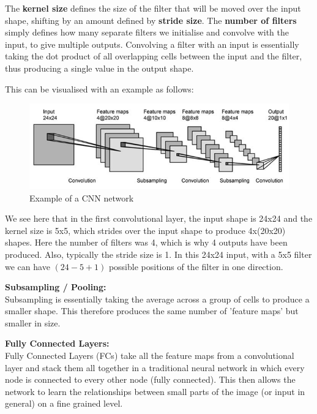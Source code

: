 \documentclass[12pt,a4paper,twoside]{report}
\begin{document}
The \textbf{kernel size} defines the size of the filter that will be moved over the input shape, shifting by an amount defined by \textbf{stride size}. The \textbf{number of filters} simply defines how many separate filters we initialise and convolve with the input, to give multiple outputs. Convolving a filter with an input is essentially taking the dot product of all overlapping cells between the input and the filter, thus producing a single value in the output shape. 

This can be visualised with an example as follows:\\

\begin{figure}[H]

\centering
\includegraphics[width=\textwidth]{CNN-Example}
\caption{Example of a CNN network}
\end{figure}

We see here that in the first convolutional layer, the input shape is 24x24 and the kernel size is 5x5, which strides over the input shape to produce 4x(20x20) shapes. Here the number of filters was 4, which is why 4 outputs have been produced. Also, typically the stride size is 1. In this 24x24 input, with a 5x5 filter we can have $(24-5+1)$ possible positions of the filter in one direction. 

\textbf{Subsampling / Pooling:}\\
Subsampling is essentially taking the average across a group of cells to produce a smaller shape. This therefore produces the same number of 'feature maps' but smaller in size. 

\textbf{Fully Connected Layers:}\\
Fully Connected Layers (FCs) take all the feature maps from a convolutional layer and stack them all together in a traditional neural network in which every node is connected to every other node (fully connected). This then allows the network to learn the relationships between small parts of the image (or input in general) on a fine grained level. 
\end{document}
